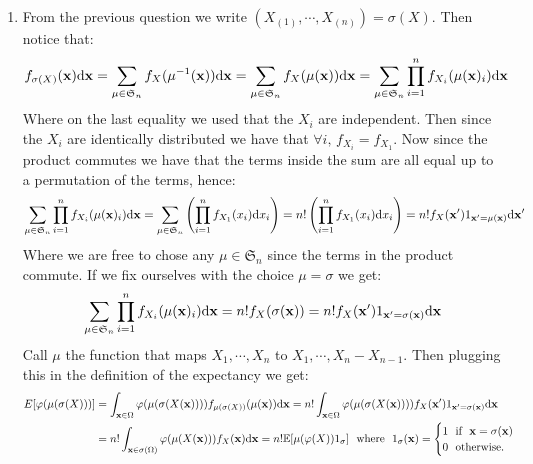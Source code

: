 \documentclass[10pt,a4paper]{article}
\begin{document}
\begin{enumerate}
\item From the previous question we write $(X_{(1)}, \cdots, X_{(n)}) = \sigma(X)$. Then notice that:
\[
f_{\sigma(X)}(\vb{x}) \dd \vb{x} = \sum_{\mu \in \mathfrak{S}_n} f_X(\mu^{-1}(\vb{x})) \dd \vb{x} = \sum_{\mu \in \mathfrak{S}_n} f_X(\mu(\vb{x})) \dd \vb{x} = \sum_{\mu \in \mathfrak{S}_n} \prod_{i = 1}^n f_{X_i}(\mu(\vb{x})_i) \dd \vb{x}
\]
Where on the last equality we used that the $X_i$ are independent. Then since the $X_i$ are identically distributed we have that $\forall i, \, f_{X_i} = f_{X_1}$. Now since the product commutes we have that the terms inside the sum are all equal up to a permutation of the terms, hence:
\[
\sum_{\mu \in \mathfrak{S}_n} \prod_{i = 1}^n f_{X_i}(\mu(\vb{x})_i) \dd \vb{x} = \sum_{\mu \in \mathfrak{S}_n} \left( \prod_{i = 1}^n f_{X_1}(x_i) \dd x_i \right) = n!\left( \prod_{i = 1}^n f_{X_1}(x_i) \dd x_i \right) = n! f_X(\vb{x'}) 1_{\vb{x'} = \mu(\vb{x})} \dd \vb{x'}
\]
Where we are free to chose any $\mu \in \mathfrak{S}_n$ since the terms in the product commute. If we fix ourselves with the choice $\mu = \sigma$ we get:
\[
\sum_{\mu \in \mathfrak{S}_n} \prod_{i = 1}^n f_{X_i}(\mu(\vb{x})_i) \dd \vb{x} = n! f_X(\sigma(\vb{x})) = n! f_X(\vb{x'}) 1_{\vb{x'} = \sigma(\vb{x})} \dd \vb{x}
\]
Call $\mu$ the function that maps $X_1, \cdots, X_n$ to $X_1, \cdots, X_n - X_{n-1}$. Then plugging this in the definition of the expectancy we get:
\begin{align*}
E[\varphi(\mu(\sigma(X)))] &= \int_{\vb{x} \in \Omega} \varphi(\mu(\sigma(X(\vb{x})))) f_{\mu(\sigma(X))}(\mu(\vb{x})) \dd \vb{x} = n! \int_{\vb{x} \in \Omega} \varphi(\mu(\sigma(X(\vb{x})))) f_{X}(\vb{x'}) 1_{\vb{x'} = \sigma(\vb{x})} \dd \vb{x}\\
&= n! \int_{\vb{x} \in \sigma(\Omega)} \varphi(\mu(X(\vb{x}))) f_{X}(\vb{x}) \dd \vb{x} = n! \mathbb{E}[\mu(\varphi(X)) 1_{\sigma}] \mbox{~~where~~} 1_\sigma(\vb{x}) = \begin{cases}
1 \mbox{~~if~~} \vb{x} = \sigma(\vb{x})\\
0 \mbox{~~otherwise.}
\end{cases}
\end{align*}


\end{enumerate}
\end{document}
